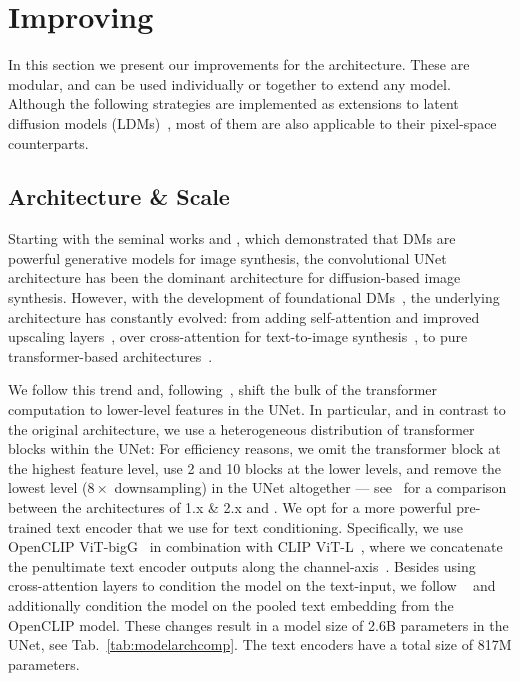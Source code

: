 \documentclass{article}
\begin{document}
%

%


%

%
%
%
%
%
%


%
%



\section{Improving \sd}
%
In this section we present our improvements for the \sd architecture. These are modular, and can be used individually or together to extend any model. Although the following strategies are implemented as extensions to latent diffusion models (LDMs)~\cite{rombach2021high}, most of them are also applicable to their pixel-space counterparts.
%
\userstudyandmodel
%
\subsection{Architecture \& Scale}
\label{subsec:archi_and_scale}
\modelarchcomp

Starting with the seminal works \citet{ho2020denoising} and \citet{song2020score}, which demonstrated that DMs are powerful generative models for image synthesis, the convolutional UNet~\cite{ronneberger2015u} architecture has been the dominant architecture for diffusion-based image synthesis. However, with the development of foundational DMs~\cite{saharia2022photorealistic,ramesh2022hierarchical,rombach2021high}, the underlying architecture has constantly evolved: from adding self-attention and improved upscaling layers~\cite{dhariwal2021diffusion}, over cross-attention for text-to-image synthesis~\cite{rombach2021high}, to pure transformer-based architectures~\cite{peebles2022scalable}.

We follow this trend and, following~\citet{hoogeboom2023simple}, shift the bulk of the transformer computation to lower-level features in the UNet. In particular, and in contrast to the original \sd architecture, we use a heterogeneous distribution of transformer blocks within the UNet: For efficiency reasons, we omit the transformer block at the highest feature level, use 2 and 10 blocks at the lower levels, and remove the lowest level ($8 \times$ downsampling) in the UNet altogether --- see~ for a comparison between the architectures of \sd 1.x \& 2.x and \modelname. We opt for a more powerful pre-trained text encoder that we use for text conditioning. Specifically, we use OpenCLIP ViT-bigG~\cite{ilharco_gabriel_2021_5143773} in combination with CLIP ViT-L~\cite{radford2021learning}, where we concatenate the penultimate text encoder outputs along the channel-axis~\cite{balaji2022ediffi}. Besides using cross-attention layers to condition the model on the text-input, we follow ~\cite{nichol2021glide} and additionally condition the model on the pooled text embedding from the OpenCLIP model. These changes result in a model size of 2.6B parameters in the UNet, see Tab.~\ref{tab:modelarchcomp}. The text encoders have a total size of 817M parameters.
\end{document}
